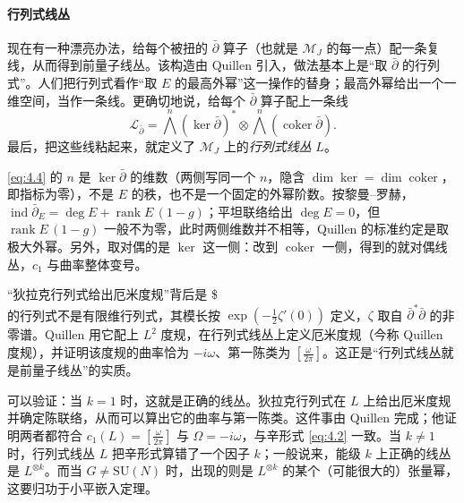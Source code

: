 \paragraph{行列式线丛}
现在有一种漂亮办法，给每个被扭的 $\bar\partial$ 算子（也就是 $\mathcal{M}_J$ 的每一点）配一条复线，从而得到前量子线丛。该构造由 Quillen \cite{quillen1986} 引入，做法基本上是“取 $\bar\partial$ 的行列式”。人们把行列式看作“取 $E$ 的最高外幂”这一操作的替身；最高外幂给出一个一维空间，当作一条线。更确切地说，给每个 $\bar\partial$ 算子配上一条线
\begin{equation}\tag{4.4}\label{eq:4.4}
  \mathcal{L}_{\bar\partial}
  = \bigwedge^{n}(\ker\bar\partial)^{*}\otimes\bigwedge^{n}(\operatorname{coker}\bar\partial).
\end{equation}
最后，把这些线粘起来，就定义了 $\mathcal{M}_J$ 上的\textit{行列式线丛} $L$。

\begin{yizhu}[易错点]
\eqref{eq:4.4} 的 $n$ 是 $\ker\bar\partial$ 的维数（两侧写同一个 $n$，隐含 $\dim\ker=\dim\operatorname{coker}$，即指标为零），不是 $E$ 的秩，也不是一个固定的外幂阶数。按黎曼--罗赫，$\operatorname{ind}\bar\partial_E=\deg E+\operatorname{rank}E\,(1-g)$；平坦联络给出 $\deg E=0$，但 $\operatorname{rank}E\,(1-g)$ 一般不为零，此时两侧维数并不相等，Quillen 的标准约定是取极大外幂。另外，取对偶的是 $\ker$ 这一侧：改到 $\operatorname{coker}$ 一侧，得到的就对偶线丛，$c_1$ 与曲率整体变号。
\end{yizhu}

\begin{yizhu}[含糊点]
“狄拉克行列式给出厄米度规”背后是 \$\\ 的行列式不是有限维行列式，其模长按 $\exp(-\frac12\zeta'(0))$ 定义，$\zeta$ 取自 $\bar\partial^*\bar\partial$ 的非零谱。Quillen \cite{quillen1986} 用它配上 $L^2$ 度规，在行列式线丛上定义厄米度规（今称 Quillen 度规），并证明该度规的曲率恰为 $-i\omega$、第一陈类为 $[\frac{\omega}{2\pi}]$。这正是“行列式线丛就是前量子线丛”的实质。
\end{yizhu}

可以验证：当 $k=1$ 时，这就是正确的线丛。狄拉克行列式在 $L$ 上给出厄米度规并确定陈联络，从而可以算出它的曲率与第一陈类。这件事由 Quillen 完成；他证明两者都符合 $c_1(L)=[\frac{\omega}{2\pi}]$ 与 $\Omega=-i\omega$，与辛形式 \eqref{eq:4.2} 一致。当 $k\neq1$ 时，行列式线丛 $L$ 把辛形式算错了一个因子 $k$；一般说来，能级 $k$ 上正确的线丛是 $L^{\otimes k}$。而当 $G\neq\mathrm{SU}(N)$ 时，出现的则是 $L^{\otimes k}$ 的某个（可能很大的）张量幂，这要归功于小平嵌入定理。

